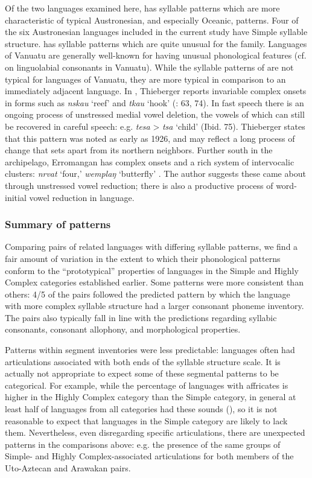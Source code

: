   Of the two languages examined here,  has syllable patterns which are more characteristic of typical Austronesian, and especially Oceanic, patterns. Four of the six Austronesian languages included in the current study have Simple syllable structure.  has syllable patterns which are quite unusual for the family. Languages of Vanuatu are generally well-known for having unusual phonological features (cf. \citealt{Maddieson1989b} on linguolabial consonants in Vanuatu). While the syllable patterns of  are not typical for languages of Vanuatu, they are more typical in comparison to an immediately adjacent language. In , Thieberger reports invariable complex onsets in forms such as \textit{nskau} ‘reef’ and \textit{tkau} ‘hook’ (\citealt{Thieberger2004}: 63, 74). In fast speech there is an ongoing process of unstressed medial vowel deletion, the vowels of which can still be recovered in careful speech: e.g. \textit{tesa} > \textit{tsa} ‘child’ (Ibid. 75). Thieberger states that this pattern was noted as early as 1926, and may reflect a long process of change that sets  apart from its northern neighbors. Further south in the archipelago, Erromangan has complex onsets and a rich system of intervocalic clusters: \textit{nrvat} ‘four,’ \textit{wemplaŋ} ‘butterfly’ \citep[20--22]{Crowley1998}. The author suggests these came about through unstressed vowel reduction; there is also a productive process of word-initial vowel reduction in language.

\subsubsection{{Summary} {of} {patterns}}\label{sec:8.4.3.7}

  Comparing pairs of related languages with differing syllable patterns, we find a fair amount of variation in the extent to which their phonological patterns conform to the ``prototypical'' properties of languages in the Simple and Highly Complex categories established earlier. Some patterns were more consistent than others: 4/5 of the pairs followed the predicted pattern by which the language with more complex syllable structure had a larger consonant phoneme inventory. The pairs also typically fall in line with the predictions regarding syllabic consonants, consonant allophony, and morphological properties.

  Patterns within segment inventories were less predictable: languages often had articulations associated with both ends of the syllable structure scale. It is actually not appropriate to expect some of these segmental patterns to be categorical. For example, while the percentage of languages with affricates is higher in the Highly Complex category than the Simple category, in general at least half of languages from all categories had these sounds (), so it is not reasonable to expect that languages in the Simple category are likely to lack them. Nevertheless, even disregarding specific articulations, there are unexpected patterns in the comparisons above: e.g. the presence of the same groups of Simple- and Highly Complex-associated articulations for both members of the Uto-Aztecan and Arawakan pairs.

